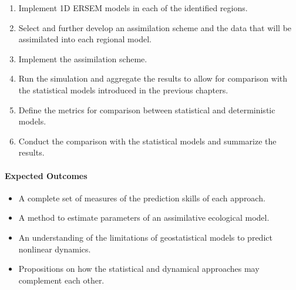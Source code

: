 \begin{enumerate}

\item Implement 1D ERSEM models in each of the identified regions.

\item Select and further develop an assimilation scheme and the data that will
be assimilated into each regional model.

\item Implement the assimilation scheme.

\item Run the simulation and aggregate the results to allow for comparison with
the statistical models introduced in the previous chapters.

\item Define the metrics for comparison between statistical and deterministic
models.

\item Conduct the comparison with the statistical models and summarize the
results.

\end{enumerate}

\paragraph{Expected Outcomes}

\begin{itemize}

\item A complete set of measures of the prediction skills of each approach.

\item A method to estimate parameters of an assimilative ecological model.

\item An understanding of the limitations of geostatistical models to predict
nonlinear dynamics. 

\item Propositions on how the statistical and dynamical approaches may
complement each other.

\end{itemize}

